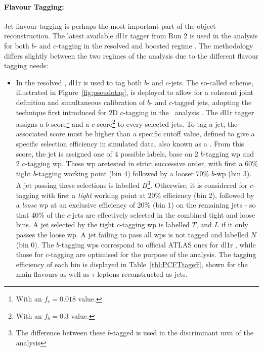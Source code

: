 \paragraph{Flavour Tagging:} Jet flavour tagging is perhaps the most important part of the object reconstruction. The latest available \gls{dl1r} tagger from Run 2 is used in the analysis for both $b$- and $c$-tagging in the resolved and boosted regime \cite{atlas:FTAGRUN2}. The methodology differs slightly between the two regimes of the analysis due to the different flavour tagging needs:  %
\begin{itemize}
  \item In the resolved \vhbc, \gls{dl1r} is used to tag both $b$- and $c$-jets. The so-called  scheme, illustrated in Figure~\ref{fig:pseudotag}, is deployed to allow for a coherent joint definition and simultaneous calibration of $b$- and $c$-tagged jets, adopting the technique first introduced for 2D $c$-tagging in the \vhc\ analysis \cite{Collaboration:2721696}. The \gls{dl1r} tagger assigns a $b$-score\footnote{With an $f_c = 0.018$ value.} and a $c$-score\footnote{With an $f_b = 0.3$ value.} to every selected jets. To tag a jet, the associated score must be higher than a specific cutoff value, defined to give a specific selection efficiency in simulated data, also known as a . From this score, the jet is assigned one of 4 possible labels, base on 2 $b$-tagging \gls{wp} and 2 $c$-tagging \gls{wp}. These \gls{wp} aretested in strict successive order, with first a 60\% tight $b$-tagging working point (bin 4) followed by a looser 70\% $b$-\gls{wp} (bin 3). A jet passing these selections is labelled $B$\footnote{The difference between these $b$-tagged is used in the discriminant \gls{mva} of the analysis}. Otherwise, it is considered for $c$-tagging with first a \textit{tight} working point at 20\% efficiency (bin 2), followed by a \textit{loose} \gls{wp} at an exclusive efficiency of 20\% (bin 1) on the remaining jets - so that 40\% of the $c$-jets are effectively selected in the combined tight and loose bins. A jet selected by the tight $c$-tagging \gls{wp} is labelled $T$, and $L$ if it only passes the loose \gls{wp}. A jet failing to pass all \gls{wp}s is not tagged and labelled $N$ (bin 0). The $b$-tagging \gls{wp}s correspond to official ATLAS ones for \gls{dl1r} \cite{atlas:FTAGRUN2}, while those for $c$-tagging are optimised for the purpose of the analysis. The tagging efficiency of each bin is displayed in Table~\ref{tbl:PCFTtageff}, shown for the main flavours as well as $\tau$-leptons reconstructed as jets.

\end{itemize}

